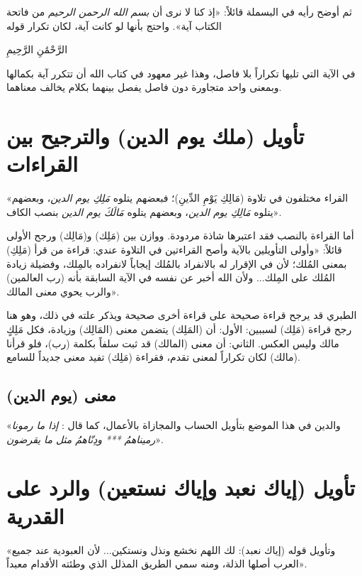 ثم أوضح  رأيه في البسملة قائلاً: «إذ كنا لا نرى أن \textit{بسم الله الرحمن الرحيم} من فاتحة الكتاب آية». واحتج بأنها لو كانت آية، لكان تكرار قوله \begin{ayah}الرَّحْمَٰنِ الرَّحِيمِ\end{ayah} في الآية التي تليها تكراراً بلا فاصل، وهذا غير معهود في كتاب الله أن تتكرر آية بكمالها وبمعنى واحد متجاورة دون فاصل يفصل بينهما بكلام يخالف معناهما.

\separator

\section{تأويل (ملك يوم الدين) والترجيح بين القراءات}
 «القراء مختلفون في تلاوة (مَالِكِ يَوْمِ الدِّينِ)؛ فبعضهم يتلوه \textit{مَلِكِ يوم الدين}، وبعضهم يتلوه \textit{مَالِكِ يوم الدين}، وبعضهم يتلوه \textit{مَالَكَ يوم الدين} بنصب الكاف».

أما القراءة بالنصب فقد اعتبرها شاذة مردودة. ووازن بين (مَلِك) و(مَالِك) ورجح الأولى قائلاً: «وأولى التأويلين بالآية وأصح القراءتين في التلاوة عندي: قراءة من قرأ (مَلِكِ) بمعنى المُلك؛ لأن في الإقرار له بالانفراد بالمُلك إيجاباً لانفراده بالمِلك، وفضيلة زيادة المُلك على المِلك... ولأن الله أخبر عن نفسه في الآية السابقة بأنه (رب العالمين) والرب يحوي معنى المالك».

\begin{fawaid}
الطبري قد يرجح قراءة صحيحة على قراءة أخرى صحيحة ويذكر علته في ذلك، وهو هنا رجح قراءة (مَلِك) لسببين:
الأول: أن (المَلِك) يتضمن معنى (المَالِك) وزيادة، فكل مَلِكٍ مالك وليس العكس.
الثاني: أن معنى (المالك) قد ثبت سلفاً بكلمة (رب)، فلو قرأنا (مالك) لكان تكراراً لمعنى تقدم، فقراءة (مَلِك) تفيد معنى جديداً للسامع.
\end{fawaid}

\subsection{معنى (يوم الدين)}
 «والدين في هذا الموضع بتأويل الحساب والمجازاة بالأعمال، كما قال : \textit{إذا ما رمونا رميناهمُ *** ودِنّاهمُ مثل ما يقرضون}».

\separator

\section{تأويل (إياك نعبد وإياك نستعين) والرد على القدرية}
 «وتأويل قوله (إياك نعبد): لك اللهم نخشع ونذل ونستكين... لأن العبودية عند جميع العرب أصلها الذلة، ومنه سمي الطريق المذلل الذي وطئته الأقدام معبداً».

